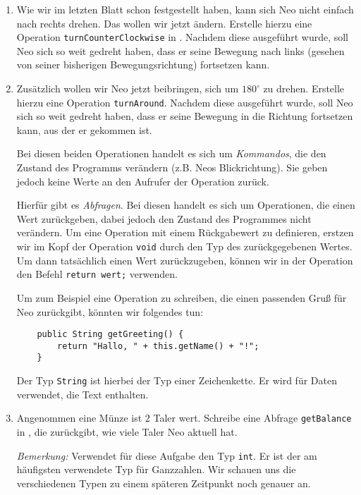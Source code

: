     \begin{enumerate}[label=\alph*)]
        \item
        Wie wir im letzten Blatt schon festgestellt haben, kann sich Neo nicht einfach nach rechts drehen. Das wollen wir jetzt ändern.
        Erstelle hierzu eine Operation \lstinline{turnCounterClockwise} in \ownclass. Nachdem diese ausgeführt wurde, soll Neo sich so weit gedreht haben, dass er seine Bewegung nach links (gesehen von seiner bisherigen Bewegungsrichtung) fortsetzen kann.
    
    
        \item
        Zusätzlich wollen wir Neo jetzt beibringen, sich um \(180^\circ\) zu drehen.
        Erstelle hierzu eine Operation \lstinline{turnAround}.
        Nachdem diese ausgeführt wurde, soll Neo sich so weit gedreht haben, dass er seine Bewegung in die Richtung fortsetzen kann, aus der er gekommen ist.
    
    
        Bei diesen beiden Operationen handelt es sich um \emph{Kommandos}, die den Zustand des Programms verändern (z.B. Neos Blickrichtung). Sie geben jedoch keine Werte an den Aufrufer der Operation zurück.
    
        Hierfür gibt es \emph{Abfragen}. Bei diesen handelt es sich um Operationen, die einen Wert zurückgeben, dabei jedoch den Zustand des Programmes nicht verändern. Um eine Operation mit einem Rückgabewert zu definieren, erstzen wir im Kopf der Operation \lstinline{void} durch den Typ des zurückgegebenen Wertes. Um dann tatsächlich einen Wert zurückzugeben, können wir in der Operation den Befehl \lstinline{return wert;} verwenden.
    
        Um zum Beispiel eine Operation zu schreiben, die einen passenden Gruß für Neo zurückgibt, könnten wir folgendes tun:
        \begin{lstlisting}
    public String getGreeting() {
        return "Hallo, " + this.getName() + "!";
    }
        \end{lstlisting}
        Der Typ \lstinline{String} ist hierbei der Typ einer Zeichenkette. Er wird für Daten verwendet, die Text enthalten.
    
        \item Angenommen eine Münze ist \(2\) Taler wert. Schreibe eine Abfrage
        \lstinline{getBalance} in \ownclass{}, die  zurückgibt, wie viele Taler Neo aktuell hat.
    
        \emph{Bemerkung:} Verwendet für diese Aufgabe den Typ \lstinline{int}. Er ist der am häufigsten verwendete Typ für Ganzzahlen. Wir schauen uns die verschiedenen Typen zu einem späteren Zeitpunkt noch genauer an.
    

\end{enumerate}
